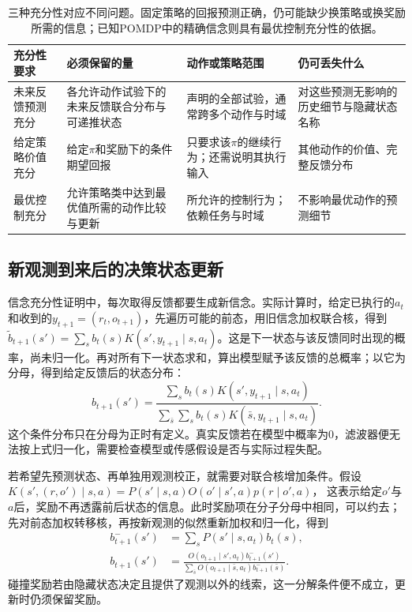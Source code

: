 \begin{table}[htbp]
  \centering
  \small
  \begin{tabularx}{\linewidth}{p{25mm}XXX}
    \toprule
    充分性要求 & 必须保留的量 & 动作或策略范围 & 仍可丢失什么 \\
    \midrule
    未来反馈预测充分 & 各允许动作试验下的未来反馈联合分布与可递推状态 & 声明的全部试验，通常跨多个动作与时域 & 对这些预测无影响的历史细节与隐藏状态名称 \\
    给定策略价值充分 & 给定$\pi$和奖励下的条件期望回报 & 只要求该$\pi$的继续行为；还需说明其执行输入 & 其他动作的价值、完整反馈分布 \\
    最优控制充分 & 允许策略类中达到最优值所需的动作比较与更新 & 所允许的控制行为；依赖任务与时域 & 不影响最优动作的预测细节 \\
    \bottomrule
  \end{tabularx}
  \caption{三种充分性对应不同问题。固定策略的回报预测正确，仍可能缺少换策略或换奖励所需的信息；已知POMDP中的精确信念则具有最优控制充分性的依据。}
  \label{tab:rl-information-sufficiency}
\end{table}

\subsection{新观测到来后的决策状态更新}
\label{sec:rl-information-filtering}

信念充分性证明中，每次取得反馈都要生成新信念。实际计算时，给定已执行的$a_t$和收到的$y_{t+1}=(r_t,o_{t+1})$，先遍历可能的前态，用旧信念加权联合核，得到
$\widetilde b_{t+1}(s')=\sum_s b_t(s)K(s',y_{t+1}\mid s,a_t)$。这是下一状态与该反馈同时出现的概率，尚未归一化。再对所有下一状态求和，算出模型赋予该反馈的总概率；以它为分母，得到给定反馈后的状态分布：
\begin{equation}
  \label{eq:rl-information-bayes}
  b_{t+1}(s')
  =\frac{\sum_s b_t(s)K(s',y_{t+1}\mid s,a_t)}
         {\sum_{\bar s}\sum_s b_t(s)K(\bar s,y_{t+1}\mid s,a_t)}.
\end{equation}
这个条件分布只在分母为正时有定义。真实反馈若在模型中概率为0，滤波器便无法按上式归一化，需要检查模型或传感假设是否与实际过程失配。

若希望先预测状态、再单独用观测校正，就需要对联合核增加条件。假设
$K(s',(r,o')\mid s,a)=P(s'\mid s,a)O(o'\mid s',a)p(r\mid o',a)$，
这表示给定$o'$与$a$后，奖励不再透露前后状态的信息。此时奖励项在分子分母中相同，可以约去；先对前态加权转移核，再按新观测的似然重新加权和归一化，得到
\begin{align}
  \label{eq:rl-information-predict-correct}
  b_{t+1}^{-}(s')&=\sum_sP(s'\mid s,a_t)b_t(s),\\
  b_{t+1}(s')&=
  \frac{O(o_{t+1}\mid s',a_t)b_{t+1}^{-}(s')}
       {\sum_{\bar s}O(o_{t+1}\mid\bar s,a_t)b_{t+1}^{-}(\bar s)}.
  \nonumber
\end{align}
碰撞奖励若由隐藏状态决定且提供了观测以外的线索，这一分解条件便不成立，更新时仍须保留奖励。

